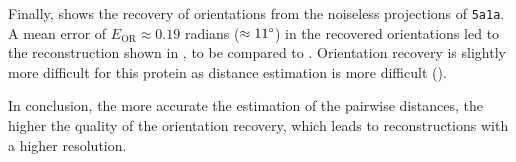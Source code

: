 Finally,  shows the recovery of orientations from the noiseless projections of \texttt{5a1a}.
A mean error of $E_\text{OR} \approx 0.19$ radians ($\approx 11\degree$) in the recovered orientations led to the reconstruction shown in , to be compared to . 
Orientation recovery is slightly more difficult for this protein as distance estimation is more difficult ().

In conclusion, the more accurate the estimation of the pairwise distances, the higher the quality of the orientation recovery, which leads to reconstructions with a higher resolution. %


